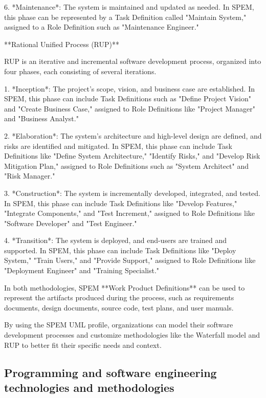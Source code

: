 \documentclass{article}
\begin{document}
6. *Maintenance*: The system is maintained and updated as needed. In SPEM, this phase can be represented by a Task Definition called "Maintain System," assigned to a Role Definition such as "Maintenance Engineer."

**Rational Unified Process (RUP)**

RUP is an iterative and incremental software development process, organized into four phases, each consisting of several iterations.

1. *Inception*: The project's scope, vision, and business case are established. In SPEM, this phase can include Task Definitions such as "Define Project Vision" and "Create Business Case," assigned to Role Definitions like "Project Manager" and "Business Analyst."

2. *Elaboration*: The system's architecture and high-level design are defined, and risks are identified and mitigated. In SPEM, this phase can include Task Definitions like "Define System Architecture," "Identify Risks," and "Develop Risk Mitigation Plan," assigned to Role Definitions such as "System Architect" and "Risk Manager."

3. *Construction*: The system is incrementally developed, integrated, and tested. In SPEM, this phase can include Task Definitions like "Develop Features," "Integrate Components," and "Test Increment," assigned to Role Definitions like "Software Developer" and "Test Engineer."

4. *Transition*: The system is deployed, and end-users are trained and supported. In SPEM, this phase can include Task Definitions like "Deploy System," "Train Users," and "Provide Support," assigned to Role Definitions like "Deployment Engineer" and "Training Specialist."

In both methodologies, SPEM **Work Product Definitions** can be used to represent the artifacts produced during the process, such as requirements documents, design documents, source code, test plans, and user manuals. 

By using the SPEM UML profile, organizations can model their software development processes and customize methodologies like the Waterfall model and RUP to better fit their specific needs and context.


\subsection{Programming and software engineering technologies and methodologies}
\end{document}
